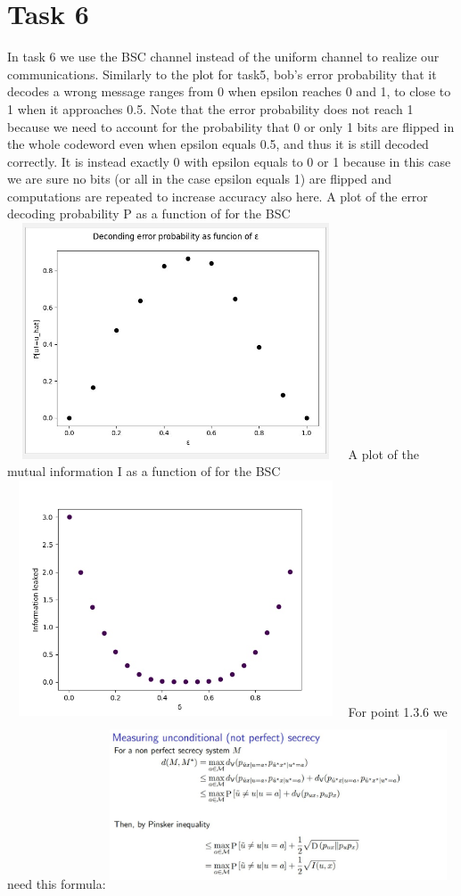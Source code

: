 \documentclass{report}
\begin{document}
\section*{Task 6}
 
 In task 6 we use the BSC channel instead of the uniform channel to realize our communications.
Similarly to the plot for task5, bob's error probability that it decodes a wrong message ranges from 0 when epsilon reaches 0 and 1, to close to 1 when it approaches 0.5.
Note that the error probability does not reach 1 because we need to account for the probability that 0 or only 1 bits are flipped in the whole codeword even when epsilon equals 0.5, and thus it is still decoded correctly.
It is instead exactly 0 with epsilon equals to 0 or 1 because in this case we are sure no bits (or all in the case epsilon equals 1) are flipped and computations are repeated to increase accuracy also here.
\hfill \break \linebreak
A plot of the error decoding probability P as a function of \textepsilon \space for the BSC
\includegraphics[width=10cm,height=7cm]{10} \hfill \break \linebreak
A plot of the mutual information I as a function of \textepsilon \space for the BSC
\includegraphics[width=10cm,height=7cm]{11} \hfill \break \linebreak
For point 1.3.6 we need this formula: \hfill \break \linebreak
\includegraphics[width=10cm,height=5cm]{12}
\end{document}
